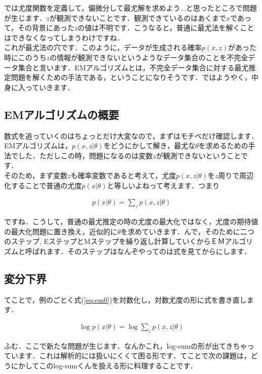 \documentclass[11pt,a4paper]{ujreport}
\begin{document}
では尤度関数を定義して，偏微分して最尤解を求めよう...と思ったところで問題が生じます．$z$が観測できないことです．観測できているのはあくまで$x$であって，その背景にあった$z$の値は不明です．こうなると，普通に最尤法を解くことはできなくなってしまうわけですね．\\

これが最尤法の穴です．このように，データが生成される確率$p(x,z)$があった時にこのうち$z$の情報が観測できないというようなデータ集合のことを不完全データ集合と言います．EMアルゴリズムとは，不完全データ集合に対する最尤推定問題を解くための手法である，ということになりそうです．ではようやく，中身に入っていきます．

\subsection{EMアルゴリズムの概要}
数式を追っていくのはちょっとだけ大変なので，まずはモチベだけ確認します．EMアルゴリズムは，$p(x,z|\theta)$をどうにかして解き，最尤な$\theta$を求めるための手法でした．ただしこの時，問題になるのは変数$z$が観測できないということです．\\

そのため，まず変数$z$も確率変数であると考えて，尤度$p(x,z|\theta)$を$z$周りで周辺化することで普通の尤度$p(x|\theta)$と等しいよねって考えます．つまり

\begin{align}
  \label{eq:em0}
  p(x|\theta) = \sum_z p(x,z|\theta)
\end{align}

ですね．こうして，普通の最尤推定の時の尤度の最大化ではなく，尤度の期待値の最大化問題に置き換え，近似的に$\theta$を求めていきます．んで，そのために二つのステップ, EステップとMステップを繰り返し計算していくからＥＭアルゴリズムと呼ばれます．そのステップはなんぞやってのは式を見てからにします．

\subsection{変分下界}
てことで，例のごとく式(\ref{eq:em0})を対数化し，対数尤度の形に式を書き直します．

\begin{align}
  \label{eq:em1}
  \log p(x|\theta) = \log \sum_z p(x,z|\theta)
\end{align}

ふむ．ここで新たな問題が生じます．なんかこれ，log-sumの形が出てきちゃっています．これは解析的には扱いにくくて困る形です．てことで次の課題は，どうにかしてこのlog-sumくんを扱える形に料理することです．\\
\end{document}

